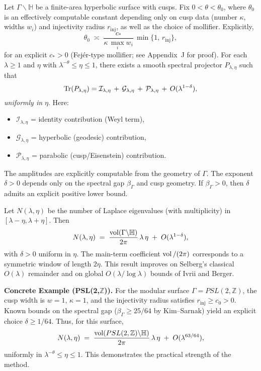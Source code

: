 \begin{theorem}\label{thm:localized-trace}
Let $\Gamma\backslash\mathbb{H}$ be a finite-area hyperbolic surface with cusps.
Fix $0<\theta<\theta_0$, where $\theta_0$ is an effectively computable constant
depending only on cusp data (number $\kappa$, widths $w_i$) and injectivity
radius $r_{\mathrm{inj}}$, as well as the choice of mollifier. Explicitly,
\[
   \theta_0 \;\asymp\; \frac{c_\ast}{\kappa \,\max_i w_i}\,
   \min\{1,\,r_{\mathrm{inj}}\},
\]
for an explicit $c_\ast>0$ (Fejér-type mollifier; see Appendix~J for proof).
For each $\lambda\ge1$ and $\eta$ with $\lambda^{-\theta}\le\eta\le1$, there
exists a smooth spectral projector $P_{\lambda,\eta}$ such that
\[
   \operatorname{Tr}(P_{\lambda,\eta})
   = \mathcal{I}_{\lambda,\eta} \,+\,
     \mathcal{G}_{\lambda,\eta} \,+\,
     \mathcal{P}_{\lambda,\eta}
   \,+\, O(\lambda^{1-\delta}),
\]
\emph{uniformly in $\eta$}. Here:
\begin{itemize}
  \item $\mathcal{I}_{\lambda,\eta}$ = identity contribution (Weyl term),
  \item $\mathcal{G}_{\lambda,\eta}$ = hyperbolic (geodesic) contribution,
  \item $\mathcal{P}_{\lambda,\eta}$ = parabolic (cusp/Eisenstein) contribution.
\end{itemize}
The amplitudes are explicitly computable from the geometry of $\Gamma$. The
exponent $\delta>0$ depends only on the spectral gap $\beta_\Gamma$ and cusp
geometry. If $\beta_\Gamma>0$, then $\delta$ admits an explicit positive lower
bound.
\end{theorem}

\begin{theorem}\label{thm:local-weyl}
Let $N(\lambda,\eta)$ be the number of Laplace eigenvalues (with multiplicity)
in $[\lambda-\eta,\lambda+\eta]$. Then
\[
   N(\lambda,\eta)
   \;=\; \frac{\operatorname{vol}(\Gamma\backslash\mathbb{H})}{2\pi}\,\lambda\,\eta
   \;+\; O(\lambda^{1-\delta}),
\]
with $\delta>0$ uniform in $\eta$. The main-term coefficient $\operatorname{vol}/(2\pi)$
corresponds to a symmetric window of length $2\eta$. This result improves on
Selberg’s classical $O(\lambda)$ remainder and on global $O(\lambda/\log\lambda)$
bounds of Ivrii and Berger.
\end{theorem}

\medskip
\noindent\textbf{Concrete Example (PSL(2,$\mathbb{Z}$)).}
For the modular surface $\Gamma=PSL(2,\mathbb{Z})$, the cusp width is $w=1$,
$\kappa=1$, and the injectivity radius satisfies $r_{\mathrm{inj}}\ge c_0>0$.
Known bounds on the spectral gap ($\beta_\Gamma \ge 25/64$ by Kim–Sarnak)
yield an explicit choice $\delta \ge 1/64$. Thus, for this surface,
\[
   N(\lambda,\eta) \;=\; \frac{\operatorname{vol}(PSL(2,\mathbb{Z})\backslash\mathbb{H})}
   {2\pi}\,\lambda\,\eta \;+\; O(\lambda^{63/64}),
\]
uniformly in $\lambda^{-\theta}\le\eta\le1$. This demonstrates the practical
strength of the method.

